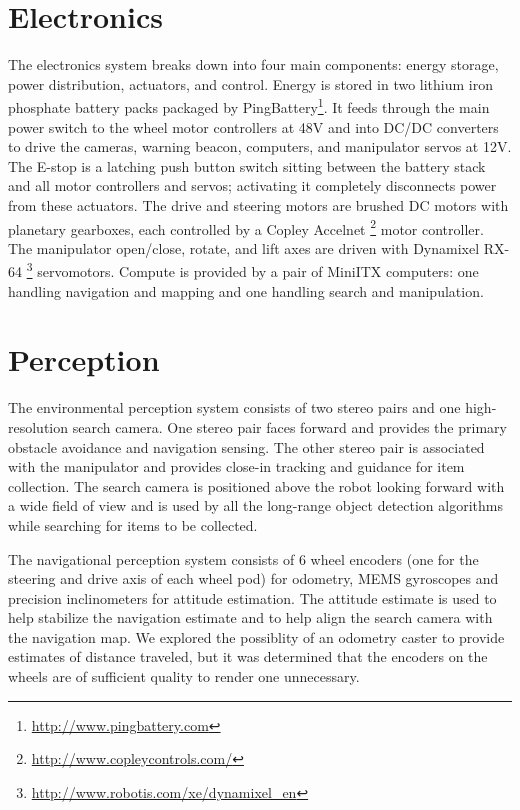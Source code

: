 \documentclass[12pt]{article}
\begin{document}
\section{Electronics}\label{Electronics}

The electronics system breaks down into four main components: energy storage, power distribution, actuators, and control. Energy is stored in two lithium iron phosphate battery packs packaged by PingBattery\footnote{\url{http://www.pingbattery.com}}. It feeds through the main power switch to the wheel motor controllers at 48V and into DC/DC converters to drive the cameras, warning beacon, computers, and manipulator servos at 12V. The E-stop is a latching push button switch sitting between the battery stack and all motor controllers and servos; activating it completely disconnects power from these actuators. The drive and steering motors are brushed DC motors with planetary gearboxes, each controlled by a Copley Accelnet \footnote{\url{http://www.copleycontrols.com/}} motor controller. The manipulator open/close, rotate, and lift axes are driven with Dynamixel RX-64 \footnote{\url{http://www.robotis.com/xe/dynamixel_en}} servomotors. Compute is provided by a pair of MiniITX computers: one handling navigation and mapping and one handling search and manipulation.

\section{Perception}\label{Perception}
The environmental perception system consists of two stereo pairs and one high-resolution search camera. One stereo pair faces forward and provides the primary obstacle avoidance and navigation sensing. The other stereo pair is associated with the manipulator and provides close-in tracking and guidance for item collection. The search camera is positioned above the robot looking forward with a wide field of view and is used by all the long-range object detection algorithms while searching for items to be collected.

The navigational perception system consists of 6 wheel encoders (one for the steering and drive axis of each wheel pod) for odometry, MEMS gyroscopes and precision inclinometers for attitude estimation. The attitude estimate is used to help stabilize the navigation estimate and to help align the search camera with the navigation map. We explored the possiblity of an odometry caster to provide estimates of distance traveled, but it was determined that the encoders on the wheels are of sufficient quality to render one unnecessary.
\end{document}
